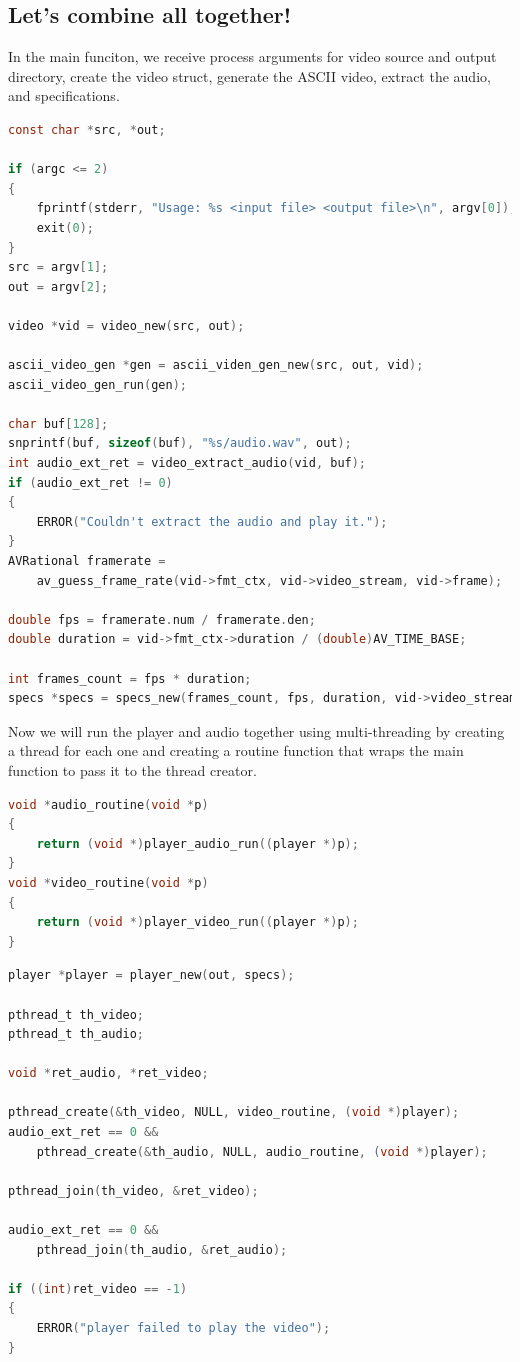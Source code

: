 \documentclass[a4paper,12pt]{article}
\begin{document}
\subsection{Let's combine all together!}
In the main funciton, we receive process arguments for video source and output directory, create the video struct, generate the ASCII video, extract the audio, and specifications.

\begin{lstlisting}[language=c]
 const char *src, *out;

if (argc <= 2)
{
    fprintf(stderr, "Usage: %s <input file> <output file>\n", argv[0]);
    exit(0);
}
src = argv[1];
out = argv[2];

video *vid = video_new(src, out);

ascii_video_gen *gen = ascii_viden_gen_new(src, out, vid);
ascii_video_gen_run(gen);

char buf[128];
snprintf(buf, sizeof(buf), "%s/audio.wav", out);
int audio_ext_ret = video_extract_audio(vid, buf);
if (audio_ext_ret != 0)
{
    ERROR("Couldn't extract the audio and play it.");
}
AVRational framerate =
    av_guess_frame_rate(vid->fmt_ctx, vid->video_stream, vid->frame);

double fps = framerate.num / framerate.den;
double duration = vid->fmt_ctx->duration / (double)AV_TIME_BASE;

int frames_count = fps * duration;
specs *specs = specs_new(frames_count, fps, duration, vid->video_stream->codecpar->width, vid->video_stream->codecpar->height, audio_ext_ret == 0 ? true : false);
\end{lstlisting}

\newpage


Now we will run the player and audio together using multi-threading by creating a thread for each one and creating a routine function that wraps the main function to pass it to the thread creator.

\begin{lstlisting}[language=c]
void *audio_routine(void *p)
{
    return (void *)player_audio_run((player *)p);
}
void *video_routine(void *p)
{
    return (void *)player_video_run((player *)p);
}    
\end{lstlisting}

\begin{lstlisting}[language=c]
player *player = player_new(out, specs);

pthread_t th_video;
pthread_t th_audio;

void *ret_audio, *ret_video;

pthread_create(&th_video, NULL, video_routine, (void *)player);
audio_ext_ret == 0 &&
    pthread_create(&th_audio, NULL, audio_routine, (void *)player);

pthread_join(th_video, &ret_video);

audio_ext_ret == 0 &&
    pthread_join(th_audio, &ret_audio);

if ((int)ret_video == -1)
{
    ERROR("player failed to play the video");
} 
\end{lstlisting}
\end{document}
